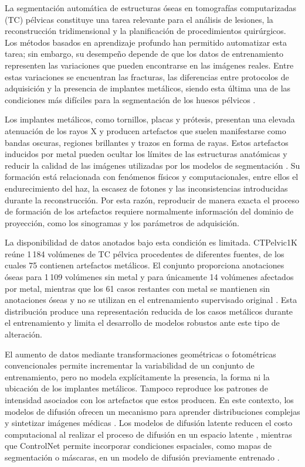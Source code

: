 
La segmentación automática de estructuras óseas en tomografías computarizadas (TC) pélvicas constituye una tarea relevante para el análisis de lesiones, la reconstrucción tridimensional y la planificación de procedimientos quirúrgicos. Los métodos basados en aprendizaje profundo han permitido automatizar esta tarea; sin embargo, su desempeño depende de que los datos de entrenamiento representen las variaciones que pueden encontrarse en las imágenes reales. Entre estas variaciones se encuentran las fracturas, las diferencias entre protocolos de adquisición y la presencia de implantes metálicos, siendo esta última una de las condiciones más difíciles para la segmentación de los huesos pélvicos \cite{liu2021ctpelvic1k}.

Los implantes metálicos, como tornillos, placas y prótesis, presentan una elevada atenuación de los rayos X y producen artefactos que suelen manifestarse como bandas oscuras, regiones brillantes y trazos en forma de rayas. Estos artefactos inducidos por metal pueden ocultar los límites de las estructuras anatómicas y reducir la calidad de las imágenes utilizadas por los modelos de segmentación \cite{selles2024marreview,xie2024implantsegmentation}. Su formación está relacionada con fenómenos físicos y computacionales, entre ellos el endurecimiento del haz, la escasez de fotones y las inconsistencias introducidas durante la reconstrucción. Por esta razón, reproducir de manera exacta el proceso de formación de los artefactos requiere normalmente información del dominio de proyección, como los sinogramas y los parámetros de adquisición.

La disponibilidad de datos anotados bajo esta condición es limitada. CTPelvic1K reúne 1\,184 volúmenes de TC pélvica procedentes de diferentes fuentes, de los cuales 75 contienen artefactos metálicos. El conjunto proporciona anotaciones óseas para 1\,109 volúmenes sin metal y para únicamente 14 volúmenes afectados por metal, mientras que los 61 casos restantes con metal se mantienen sin anotaciones óseas y no se utilizan en el entrenamiento supervisado original \cite{liu2021ctpelvic1k}. Esta distribución produce una representación reducida de los casos metálicos durante el entrenamiento y limita el desarrollo de modelos robustos ante este tipo de alteración.

El aumento de datos mediante transformaciones geométricas o fotométricas convencionales permite incrementar la variabilidad de un conjunto de entrenamiento, pero no modela explícitamente la presencia, la forma ni la ubicación de los implantes metálicos. Tampoco reproduce los patrones de intensidad asociados con los artefactos que estos producen. En este contexto, los modelos de difusión ofrecen un mecanismo para aprender distribuciones complejas y sintetizar imágenes médicas \cite{kazerouni2023diffusionsurvey}. Los modelos de difusión latente reducen el costo computacional al realizar el proceso de difusión en un espacio latente \cite{rombach2022latentdiffusion}, mientras que ControlNet permite incorporar condiciones espaciales, como mapas de segmentación o máscaras, en un modelo de difusión previamente entrenado \cite{zhang2023controlnet}.

